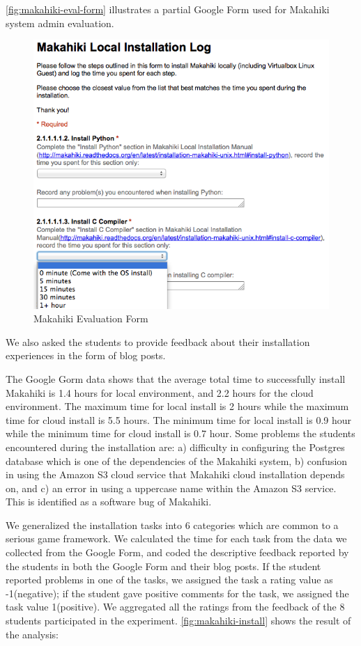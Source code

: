 \documentclass{sigchi}
\begin{document}
\autoref{fig:makahiki-eval-form} illustrates a partial Google Form
used for Makahiki system admin evaluation.

\begin{figure}[ht!]
   \centering
   \includegraphics[width=\columnwidth]{installation-eval-form}
   \caption{Makahiki Evaluation Form}
   \label{fig:makahiki-eval-form}
\end{figure}

We also asked the students to provide feedback about their installation experiences
in the form of blog posts.

The Google Gorm data shows that the average total time to successfully install Makahiki
is 1.4 hours for local environment, and 2.2 hours for the cloud environment. The maximum time for local install is 2 hours while the maximum time for cloud install is 5.5 hours. The minimum time for local install is 0.9 hour while the minimum time for cloud install is 0.7 hour. Some problems the students encountered during the installation are:
a) difficulty in configuring the Postgres database which is one of the dependencies of
the Makahiki system, b) confusion in using the Amazon S3 cloud service that Makahiki cloud
installation depends on, and c) an error in using a uppercase name within the Amazon S3 service.
This is identified as a software bug of Makahiki.


We generalized the installation tasks into 6 categories which are common to a serious game
framework. We calculated the time for each task from the data we collected from the Google
Form, and coded the descriptive feedback reported by the students in both the Google Form and
 their blog posts. If the student reported problems in one of the tasks, we assigned the task
  a rating value as -1(negative); if the student gave positive comments for the task, we
  assigned the task value 1(positive). We aggregated all the ratings from the feedback of
  the 8 students participated in the experiment. \autoref{fig:makahiki-install} shows the result of the analysis:
\end{document}
